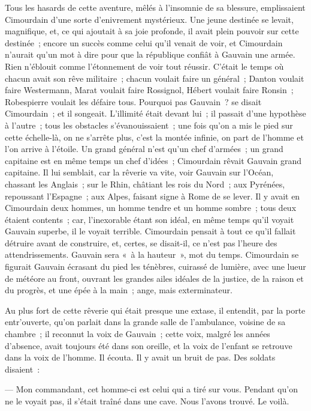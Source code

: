 \documentclass[french,twoside]{book} %
\begin{document}
Tous les hasards de cette aventure, mêlés à l’insomnie de sa blessure, emplissaient Cimourdain d’une sorte d’enivrement mystérieux. Une jeune destinée se levait, magnifique, et, ce qui ajoutait à sa joie profonde, il avait plein pouvoir sur cette destinée ; encore un succès comme celui qu’il venait de voir, et Cimourdain n’aurait qu’un mot à dire pour que la république confiât à Gauvain une armée. Rien n’éblouit comme l’étonnement de voir tout réussir. C’était le temps où chacun avait son rêve militaire ; chacun voulait faire un général ; Danton voulait faire Westermann, Marat voulait faire Rossignol, Hébert voulait faire Ronsin ; Robespierre voulait les défaire tous. Pourquoi pas Gauvain ? se disait Cimourdain ; et il songeait. L’illimité était devant lui ; il passait d’une hypothèse à l’autre ; tous les obstacles s’évanouissaient ; une fois qu’on a mis le pied sur cette échelle-là,  on ne s’arrête plus, c’est la montée infinie, on part de l’homme et l’on arrive à l’étoile. Un grand général n’est qu’un chef d’armées ; un grand capitaine est en même temps un chef d’idées ; Cimourdain rêvait Gauvain grand capitaine. Il lui semblait, car la rêverie va vite, voir Gauvain sur l’Océan, chassant les Anglais ; sur le Rhin, châtiant les rois du Nord ; aux Pyrénées, repoussant l’Espagne ; aux Alpes, faisant signe à Rome de se lever. Il y avait en Cimourdain deux hommes, un homme tendre et un homme sombre ; tous deux étaient contents ; car, l’inexorable étant son idéal, en même temps qu’il voyait Gauvain superbe, il le voyait terrible. Cimourdain pensait à tout ce qu’il fallait détruire avant de construire, et, certes, se disait-il, ce n’est pas l’heure des attendrissements. Gauvain sera « à la hauteur », mot du temps. Cimourdain se figurait Gauvain écrasant du pied les ténèbres, cuirassé de lumière, avec une lueur de météore au front, ouvrant les grandes ailes idéales de la justice, de la raison et du progrès, et une épée à la main ; ange, mais exterminateur.\par
Au plus fort de cette rêverie qui était presque une extase, il entendit, par la porte entr’ouverte, qu’on parlait dans la grande salle de l’ambulance, voisine de sa chambre ; il reconnut la voix de Gauvain ; cette voix, malgré les années d’absence, avait toujours été dans son oreille, et la voix de l’enfant se retrouve dans la voix de l’homme. Il écouta. Il y avait un bruit de pas. Des soldats disaient :\par
— Mon commandant, cet homme-ci est celui qui a  tiré sur vous. Pendant qu’on ne le voyait pas, il s’était traîné dans une cave. Nous l’avons trouvé. Le voilà.\par
\end{document}

